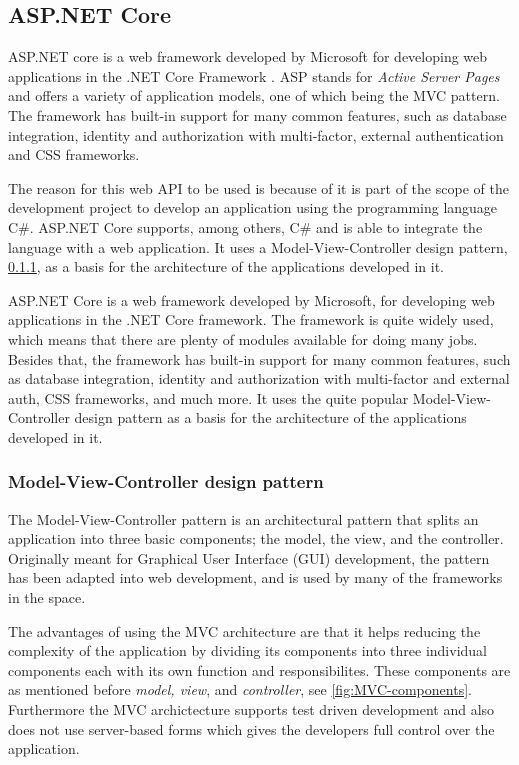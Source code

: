\documentclass[../../master.tex]{subfiles}
\begin{document}
\subsection{ASP.NET Core} \label{sec:aspnetcore}

ASP.NET core is a web framework developed by Microsoft for developing web applications in the .NET Core Framework \cite{aspnetcore2}.
ASP stands for \textit{Active Server Pages} and offers a variety of application models, one of which being the MVC pattern.
The framework has built-in support for many common features, such as database integration, identity and authorization with multi-factor, external authentication and CSS frameworks.

The reason for this web API to be used is because of it is part of the scope of the development project to develop an application using the programming language C\#.
ASP.NET Core supports, among others, C\# and is able to integrate the language with a web application.
It uses a Model-View-Controller design pattern, \cref{sec:mvc}, as a basis for the architecture of the applications developed in it.

ASP.NET Core is a web framework developed by Microsoft, for developing web applications in the .NET Core framework.
The framework is quite widely used, which means that there are plenty of modules available for doing many jobs. Besides that, the framework has built-in support for many common features, such as database integration, identity and authorization with multi-factor and external auth, CSS frameworks, and much more.
It uses the quite popular Model-View-Controller design pattern as a basis for the architecture of the applications developed in it.

\subsubsection{Model-View-Controller design pattern}\label{sec:mvc}
The Model-View-Controller pattern is an architectural pattern that splits an application into three basic components; the model, the view, and the controller.
Originally meant for Graphical User Interface (GUI) development, the pattern has been adapted into web development, and is used by many of the frameworks in the space. \cite{gangoffour}

The advantages of using the MVC architecture are that it helps reducing the complexity of the application by dividing its components into three individual components each with its own function and responsibilites.
These components are as mentioned before \textit{model, view}, and \textit{controller}, see \cref{fig:MVC-components}.
Furthermore the MVC archictecture supports test driven development and also does not use server-based forms which gives the developers full control over the application. \cite{mvcarticle}
\end{document}
